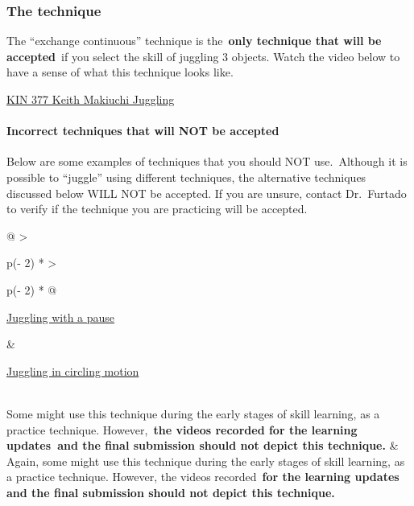 \documentclass[
  letterpaper,
  DIV=11,
  numbers=noendperiod]{scrartcl}
\let\oldparagraph\paragraph
\renewcommand{\paragraph}[1]{\oldparagraph{#1}\mbox{}}
\begin{document}
\hypertarget{the-technique}{%
\subsubsection{The technique}\label{the-technique}}

The ``exchange continuous'' technique is the~\textbf{only technique that
will be accepted}~if you select the skill of juggling 3 objects. Watch
the video below to have a sense of what this technique looks like.

\href{https://youtu.be/yAcDYYvXTaA}{KIN 377 Keith Makiuchi Juggling}

\hypertarget{incorrect-techniques-that-will-not-be-accepted}{%
\paragraph{\texorpdfstring{Incorrect techniques that will \textbf{NOT be
accepted}}{Incorrect techniques that will NOT be accepted}}\label{incorrect-techniques-that-will-not-be-accepted}}

Below are some examples of techniques that you should NOT use.~Although
it is possible to ``juggle'' using different techniques, the alternative
techniques discussed below WILL NOT be accepted. If you are unsure,
contact Dr.~Furtado to verify if the technique you are practicing will
be accepted.

\begin{longtable}[]{@{}
  >{\raggedright\arraybackslash}p{(\columnwidth - 2\tabcolsep) * }
  >{\raggedright\arraybackslash}p{(\columnwidth - 2\tabcolsep) * }@{}}
\toprule\noalign{}
\begin{minipage}[b]{\linewidth}\raggedright
\href{https://youtu.be/whiwiYz20Fo}{Juggling with a pause}
\end{minipage} & \begin{minipage}[b]{\linewidth}\raggedright
\href{https://youtu.be/sFSHpxQQchQ}{Juggling in circling motion}
\end{minipage} \\
\midrule\noalign{}
\endhead
\bottomrule\noalign{}
\endlastfoot
Some might use this technique during the early stages of skill learning,
as a practice technique. However,~\textbf{the videos recorded for the
learning updates~and the final submission should not depict this
technique.} & Again, some might use this technique during the early
stages of skill learning, as a practice technique. However, the videos
recorded~\textbf{for the learning updates and the final submission
should not depict this technique.} \\
\end{longtable}
\end{document}
